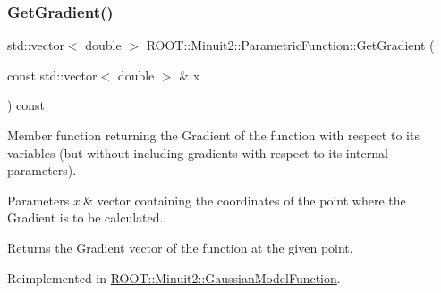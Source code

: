 \subsubsection{\texorpdfstring{GetGradient()}{GetGradient()}\hspace{0.1cm}{\footnotesize\ttfamily [1/2]}}
{\footnotesize\ttfamily std\+::vector$<$ double $>$ R\+O\+O\+T\+::\+Minuit2\+::\+Parametric\+Function\+::\+Get\+Gradient (\begin{DoxyParamCaption}\item[{const std\+::vector$<$ double $>$ \&}]{x }\end{DoxyParamCaption}) const\hspace{0.3cm}{\ttfamily [virtual]}}

Member function returning the Gradient of the function with respect to its variables (but without including gradients with respect to its internal parameters).


\begin{DoxyParams}{Parameters}
{\em x} & vector containing the coordinates of the point where the Gradient is to be calculated.\\
\hline
\end{DoxyParams}
\begin{DoxyReturn}{Returns}
the Gradient vector of the function at the given point. 
\end{DoxyReturn}


Reimplemented in \mbox{\hyperlink{classROOT_1_1Minuit2_1_1GaussianModelFunction_ac81a3c5531a291b8a9c3af533de07195}{R\+O\+O\+T\+::\+Minuit2\+::\+Gaussian\+Model\+Function}}.


